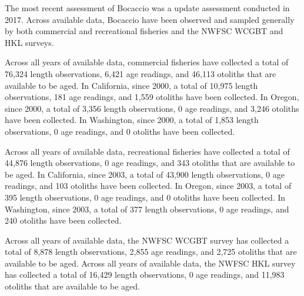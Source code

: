 \documentclass[11pt,
  english,
  letterpaper,
]{article}
\begin{document}
\leavevmode\tagmcend\tagstructend


The most recent assessment of Bocaccio was a update assessment conducted in 2017. Across available data, Bocaccio have been observed and sampled generally by both commercial and recreational fisheries and the NWFSC WCGBT and HKL surveys.

\leavevmode\tagmcend\tagstructend\par


Across all years of available data, commercial fisheries have collected a total of 76,324 length observations, 6,421 age readings, and 46,113 otoliths that are available to be aged. In California, since 2000, a total of 10,975 length observations, 181 age readings, and 1,559 otoliths have been collected. In Oregon, since 2000, a total of 3,356 length observations, 0 age readings, and 3,246 otoliths have been collected. In Washington, since 2000, a total of 1,853 length observations, 0 age readings, and 0 otoliths have been collected.

\leavevmode\tagmcend\tagstructend\par


Across all years of available data, recreational fisheries have collected a total of 44,876 length observations, 0 age readings, and 343 otoliths that are available to be aged. In California, since 2003, a total of 43,900 length observations, 0 age readings, and 103 otoliths have been collected. In Oregon, since 2003, a total of 395 length observations, 0 age readings, and 0 otoliths have been collected. In Washington, since 2003, a total of 377 length observations, 0 age readings, and 240 otoliths have been collected.

\leavevmode\tagmcend\tagstructend\par


Across all years of available data, the NWFSC WCGBT survey has collected a total of 8,878 length observations, 2,855 age readings, and 2,725 otoliths that are available to be aged. Across all years of available data, the NWFSC HKL survey has collected a total of 16,429 length observations, 0 age readings, and 11,983 otoliths that are available to be aged.

\leavevmode\tagmcend\tagstructend\par
\end{document}
